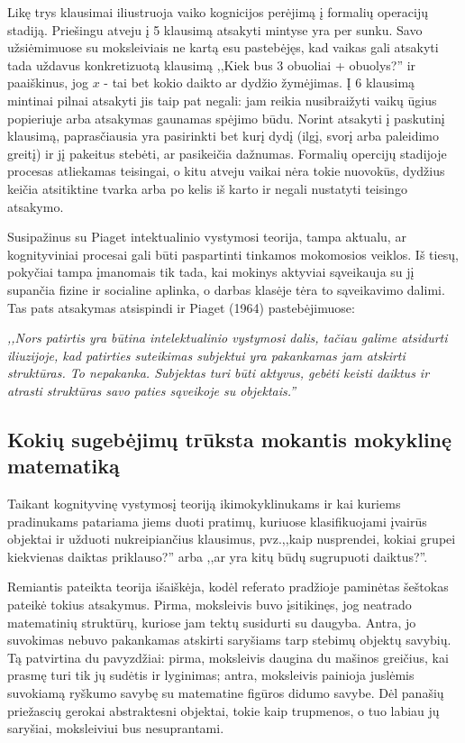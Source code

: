 \documentclass{article}
\begin{document}
Likę trys klausimai iliustruoja vaiko kognicijos perėjimą į formalių operacijų stadiją. Priešingu atveju į 5 klausimą atsakyti mintyse yra per sunku. Savo užsiėmimuose su moksleiviais ne kartą esu pastebėjęs, kad vaikas gali atsakyti tada uždavus konkretizuotą klausimą ,,Kiek bus 3 obuoliai + obuolys?'' ir paaiškinus, jog $x$ - tai bet kokio daikto ar dydžio žymėjimas. Į 6 klausimą mintinai pilnai atsakyti jis taip pat negali: jam reikia nusibraižyti vaikų ūgius popieriuje arba atsakymas gaunamas spėjimo būdu. Norint atsakyti į paskutinį klausimą, paprasčiausia yra pasirinkti bet kurį dydį (ilgį, svorį arba paleidimo greitį) ir jį pakeitus stebėti, ar pasikeičia dažnumas. Formalių opercijų stadijoje procesas atliekamas teisingai, o kitu atveju vaikai nėra tokie nuovokūs, dydžius keičia atsitiktine tvarka arba po kelis iš karto ir negali nustatyti teisingo atsakymo. 

Susipažinus su Piaget intektualinio vystymosi teorija, tampa aktualu, ar kognityviniai procesai gali būti paspartinti tinkamos mokomosios veiklos. Iš tiesų, pokyčiai tampa įmanomais tik tada, kai mokinys aktyviai sąveikauja su jį supančia fizine ir socialine aplinka, o darbas klasėje tėra to sąveikavimo dalimi. Tas pats atsakymas atsispindi ir Piaget (1964) pastebėjimuose: 

\textit{,,Nors patirtis yra būtina intelektualinio vystymosi dalis, tačiau galime atsidurti iliuzijoje, kad patirties suteikimas subjektui yra pakankamas jam atskirti struktūras. To nepakanka. Subjektas turi būti aktyvus, gebėti keisti daiktus ir atrasti struktūras savo paties sąveikoje su objektais.''}

\subsection{Kokių sugebėjimų trūksta mokantis mokyklinę matematiką}

Taikant kognityvinę vystymosį teoriją ikimokyklinukams ir kai kuriems pradinukams patariama jiems duoti pratimų, kuriuose
klasifikuojami įvairūs objektai ir užduoti nukreipiančius klausimus, pvz.,,kaip nusprendei, kokiai grupei
kiekvienas daiktas priklauso?'' arba ,,ar yra kitų būdų sugrupuoti daiktus?''. 

Remiantis pateikta teorija išaiškėja, kodėl referato pradžioje paminėtas šeštokas pateikė tokius atsakymus. Pirma, moksleivis buvo įsitikinęs, jog neatrado matematinių struktūrų, kuriose jam tektų susidurti su daugyba. Antra, jo suvokimas nebuvo pakankamas atskirti saryšiams tarp stebimų objektų savybių. Tą patvirtina du pavyzdžiai: pirma, moksleivis daugina du mašinos greičius, kai prasmę turi tik jų sudėtis ir lyginimas; antra, moksleivis painioja juslėmis suvokiamą ryškumo savybę su matematine figūros didumo savybe. Dėl panašių priežascių gerokai abstraktesni objektai, tokie kaip trupmenos, o tuo labiau jų saryšiai, moksleiviui bus nesuprantami. 
\end{document}

